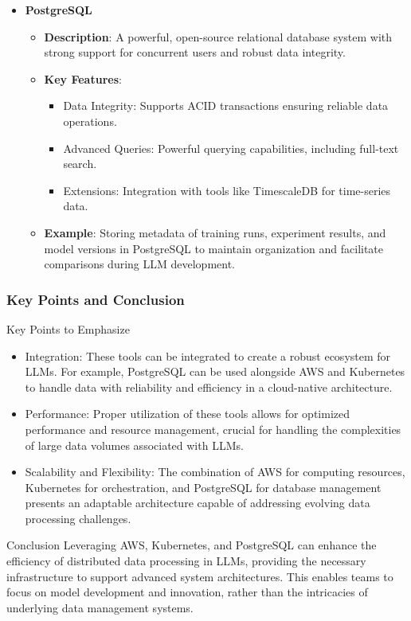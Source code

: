\documentclass[aspectratio=169]{beamer}
\begin{document}
\begin{frame}[fragile]
\begin{itemize}
        \item \textbf{PostgreSQL}
        \begin{itemize}
            \item \textbf{Description}: A powerful, open-source relational database system with strong support for concurrent users and robust data integrity.
            \item \textbf{Key Features}:
            \begin{itemize}
                \item Data Integrity: Supports ACID transactions ensuring reliable data operations.
                \item Advanced Queries: Powerful querying capabilities, including full-text search.
                \item Extensions: Integration with tools like TimescaleDB for time-series data.
            \end{itemize}
            \item \textbf{Example}: Storing metadata of training runs, experiment results, and model versions in PostgreSQL to maintain organization and facilitate comparisons during LLM development.
        \end{itemize}
    \end{itemize}
\end{frame}

\begin{frame}[fragile]
    \frametitle{Key Points and Conclusion}
    \begin{block}{Key Points to Emphasize}
        \begin{itemize}
            \item Integration: These tools can be integrated to create a robust ecosystem for LLMs. For example, PostgreSQL can be used alongside AWS and Kubernetes to handle data with reliability and efficiency in a cloud-native architecture.
            \item Performance: Proper utilization of these tools allows for optimized performance and resource management, crucial for handling the complexities of large data volumes associated with LLMs.
            \item Scalability and Flexibility: The combination of AWS for computing resources, Kubernetes for orchestration, and PostgreSQL for database management presents an adaptable architecture capable of addressing evolving data processing challenges.
        \end{itemize}
    \end{block}

    \begin{block}{Conclusion}
        Leveraging AWS, Kubernetes, and PostgreSQL can enhance the efficiency of distributed data processing in LLMs, providing the necessary infrastructure to support advanced system architectures. This enables teams to focus on model development and innovation, rather than the intricacies of underlying data management systems.
    \end{block}
\end{frame}
\end{document}
